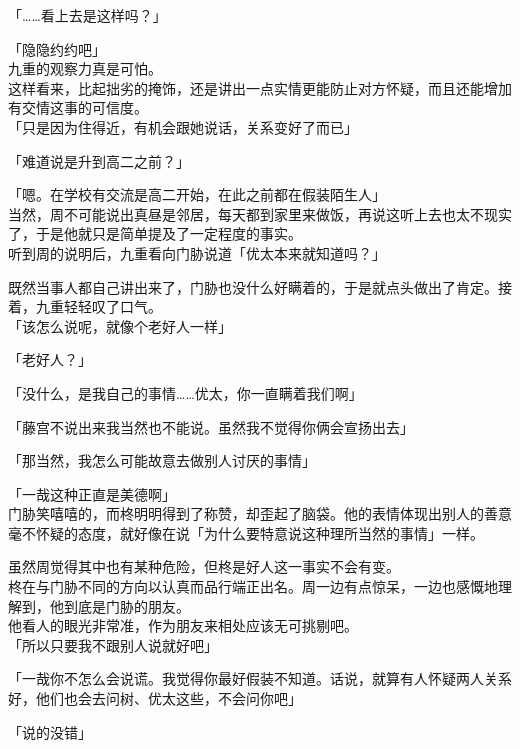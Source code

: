 「……看上去是这样吗？」

「隐隐约约吧」\\

九重的观察力真是可怕。\\

这样看来，比起拙劣的掩饰，还是讲出一点实情更能防止对方怀疑，而且还能增加有交情这事的可信度。\\

「只是因为住得近，有机会跟她说话，关系变好了而已」

「难道说是升到高二之前？」

「嗯。在学校有交流是高二开始，在此之前都在假装陌生人」\\

当然，周不可能说出真昼是邻居，每天都到家里来做饭，再说这听上去也太不现实了，于是他就只是简单提及了一定程度的事实。\\

听到周的说明后，九重看向门胁说道「优太本来就知道吗？」

既然当事人都自己讲出来了，门胁也没什么好瞒着的，于是就点头做出了肯定。接着，九重轻轻叹了口气。\\

「该怎么说呢，就像个老好人一样」

「老好人？」

「没什么，是我自己的事情……优太，你一直瞒着我们啊」

「藤宫不说出来我当然也不能说。虽然我不觉得你俩会宣扬出去」

「那当然，我怎么可能故意去做别人讨厌的事情」

「一哉这种正直是美德啊」\\

门胁笑嘻嘻的，而柊明明得到了称赞，却歪起了脑袋。他的表情体现出别人的善意毫不怀疑的态度，就好像在说「为什么要特意说这种理所当然的事情」一样。

虽然周觉得其中也有某种危险，但柊是好人这一事实不会有变。\\

柊在与门胁不同的方向以认真而品行端正出名。周一边有点惊呆，一边也感慨地理解到，他到底是门胁的朋友。\\

他看人的眼光非常准，作为朋友来相处应该无可挑剔吧。\\

「所以只要我不跟别人说就好吧」

「一哉你不怎么会说谎。我觉得你最好假装不知道。话说，就算有人怀疑两人关系好，他们也会去问树、优太这些，不会问你吧」

「说的没错」\\

